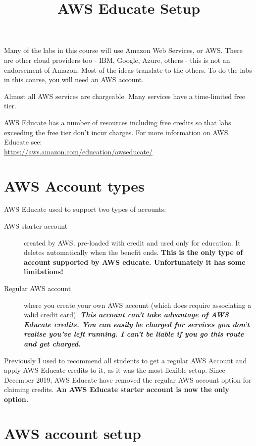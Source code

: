 \documentclass{pgnotes}
\title{AWS Educate Setup}
\begin{document}
\maketitle

Many of the labs in this course will use Amazon Web Services, or AWS.
There are other cloud providers too - IBM, Google, Azure, others - this is not an endorsement of Amazon.
Most of the ideas translate to the others.
To do the labs in this course, you will need an AWS account.

Almost all AWS services are chargeable.
Many services have a time-limited free tier.

AWS Educate has a number of resources including free credits so that labs exceeding the free tier don't incur charges.
For more information on AWS Educate see:\\
\url{https://aws.amazon.com/education/awseducate/}


\section{AWS Account types}
\label{sec:aws-account-types}

AWS Educate used to support two types of accounts:

\begin{description}
\item[AWS starter account] created by AWS, pre-loaded with credit and used only for education. It deletes automatically when the benefit ends.
  \textbf{This is the only type of account supported by AWS educate.
    Unfortunately it has some limitations!}
  
\item[Regular AWS account] where you create your own AWS account (which does require associating a valid credit card).
  \textbf{
    \textit{
      This account can't take advantage of AWS Educate credits.
      You can easily be charged for services you don't realise you've left running.
      I can't be liable if you go this route and get charged.
    }
  }
\end{description}

Previously I used to recommend all students to get a regular AWS Account and apply AWS Educate credits to it, as it was the most flexible setup.
Since December 2019, AWS Educate have removed the regular AWS account option for claiming credits.
\textbf{An AWS Educate starter account is now the only option.}

\section{AWS account setup}
\label{sec:aws-account-setup}
\end{document}
